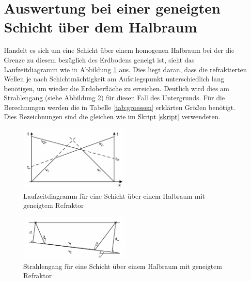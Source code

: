 \section{Auswertung bei einer geneigten Schicht über dem Halbraum}
\label{sec:geneigteSchicht}

Handelt es sich um eine Schicht über einem homogenen Halbraum bei der die Grenze zu diesem bezüglich des Erdbodens geneigt ist, sieht das Laufzeitdiagramm wie in Abbildung \ref{fig:genLauf} aus. Dies liegt daran, dass die refraktierten Wellen je nach Schichtmächtigkeit am Aufstiegspunkt unterschiedlich lang benötigen, um wieder die Erdoberfläche zu erreichen. Deutlich wird dies am Strahlengang (siehe Abbildung \ref{fig:genStr}) für diesen Fall des Untergrunds. Für die Berechnungen werden die in Tabelle \ref{tab:groessen} erklärten Größen benötigt. Dies Bezeichnungen sind die gleichen wie im Skript \ref{skript} verwendeten.

\begin{figure}
 \centering
 \includegraphics[width=0.5\textwidth]{fig/geneigtLaufzeit}
 \caption[Laufzeitdiagramm für eine Schicht über einem Halbraum mit geneigtem Refraktor]{Laufzeitdiagramm für eine Schicht über einem Halbraum mit geneigtem Refraktor \cite{skript}}
 \label{fig:genLauf}
\end{figure}

\begin{figure}
 \centering
 \includegraphics[width=0.5\textwidth]{fig/geneigtStrahlen}
 \caption[Strahlengang für eine Schicht über einem Halbraum mit geneigtem Refraktor]{Strahlengang für eine Schicht über einem Halbraum mit geneigtem Refraktor \cite{skript}}
 \label{fig:genStr}
\end{figure}

